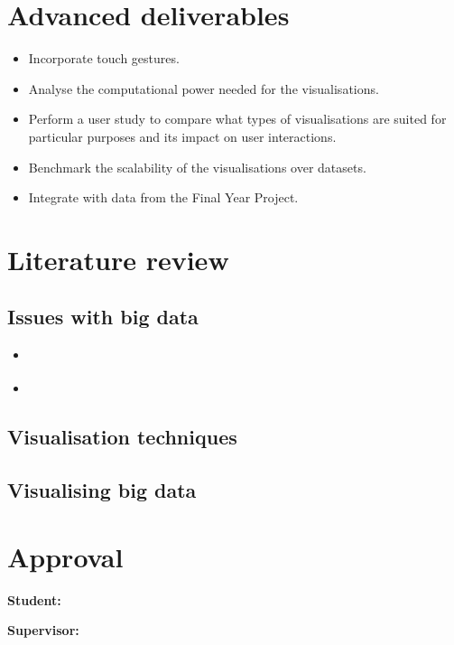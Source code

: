 \documentclass[a4paper]{article}
\begin{document}
	\section{Advanced deliverables} {
	
		\begin{itemize}
			\item Incorporate touch gestures.
			\item Analyse the computational power needed for the visualisations.
			\item Perform a user study to compare what types of visualisations are suited for particular purposes and its impact on user interactions.
			\item Benchmark the scalability of the visualisations over datasets.
			\item Integrate with data from the Final Year Project.
		\end{itemize}
	
	}
	
	\section{Literature review} {
	
		\subsection{Issues with big data} {
		
			\begin{itemize}
				\item \citet{kaisler2013big}
				\item \citet{katal2013big}		
			\end{itemize}		
		
		}
		
		\subsection{Visualisation techniques} {
		
		}
		
		\subsection{Visualising big data} {
		
		}
		
	}
	
	\section{Approval} {
	
		\vspace{1em}\par
		\textbf{Student:} 
		\vspace{2em}\par
		\textbf{Supervisor:}
		
	}
	
	
	
	
\end{document}
